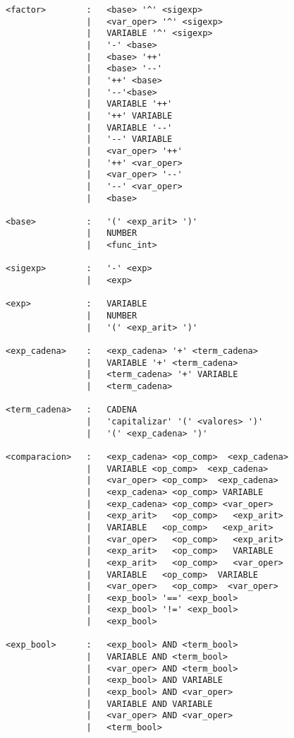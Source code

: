 \begin{verbatim}
<factor>        :   <base> '^' <sigexp>
                |   <var_oper> '^' <sigexp>
                |   VARIABLE '^' <sigexp>
                |   '-' <base>  
                |   <base> '++'
                |   <base> '--'
                |   '++' <base>
                |   '--'<base>
                |   VARIABLE '++'
                |   '++' VARIABLE
                |   VARIABLE '--'
                |   '--' VARIABLE
                |   <var_oper> '++'
                |   '++' <var_oper>
                |   <var_oper> '--'
                |   '--' <var_oper>
                |   <base>

<base>          :   '(' <exp_arit> ')'
                |   NUMBER
                |   <func_int>

<sigexp>        :   '-' <exp>
                |   <exp>

<exp>           :   VARIABLE
                |   NUMBER
                |   '(' <exp_arit> ')'

<exp_cadena>    :   <exp_cadena> '+' <term_cadena>
                |   VARIABLE '+' <term_cadena>
                |   <term_cadena> '+' VARIABLE
                |   <term_cadena> 

<term_cadena>   :   CADENA
                |   'capitalizar' '(' <valores> ')'
                |   '(' <exp_cadena> ')'

<comparacion>   :   <exp_cadena> <op_comp>  <exp_cadena>
                |   VARIABLE <op_comp>  <exp_cadena>
                |   <var_oper> <op_comp>  <exp_cadena>
                |   <exp_cadena> <op_comp> VARIABLE 
                |   <exp_cadena> <op_comp> <var_oper> 
                |   <exp_arit>   <op_comp>   <exp_arit>
                |   VARIABLE   <op_comp>   <exp_arit>
                |   <var_oper>   <op_comp>   <exp_arit>
                |   <exp_arit>   <op_comp>   VARIABLE
                |   <exp_arit>   <op_comp>   <var_oper>
                |   VARIABLE   <op_comp>  VARIABLE 
                |   <var_oper>   <op_comp>  <var_oper> 
                |   <exp_bool> '==' <exp_bool>
                |   <exp_bool> '!=' <exp_bool>
                |   <exp_bool>

<exp_bool>      :   <exp_bool> AND <term_bool>
                |   VARIABLE AND <term_bool>
                |   <var_oper> AND <term_bool>
                |   <exp_bool> AND VARIABLE
                |   <exp_bool> AND <var_oper>
                |   VARIABLE AND VARIABLE
                |   <var_oper> AND <var_oper>
                |   <term_bool>


\end{verbatim}
